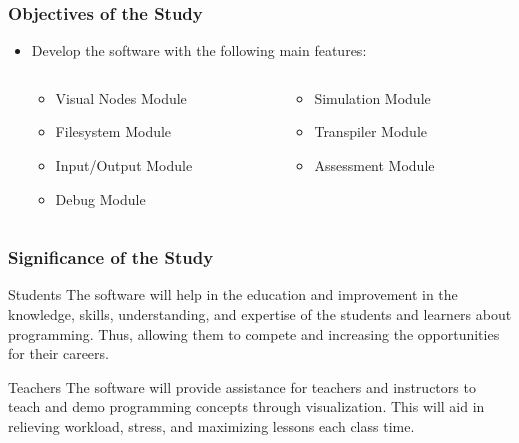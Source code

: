 \documentclass[handout]{beamer}
\newcommand{\parx}{
	\setlength{\parindent}{4em}
	\par}
\begin{document}
\begin{frame}
	\frametitle{Objectives of the Study}
	\justifying
	\parx
	\begin{itemize}
		\item<1-> Develop the software with the following main features:
		\begin{columns}
			\begin{column}{.5\linewidth}
				\begin{itemize}
						\item<2-> Visual Nodes Module
						\item<3-> Filesystem Module
						\item<4-> Input/Output Module
						\item<5-> Debug Module
				\end{itemize}
			\end{column}
			\begin{column}{.5\linewidth}
				\begin{itemize}
						\item<9-> Simulation Module
						\item<7-> Transpiler Module
						\item<8-> Assessment Module
				\end{itemize}
			\end{column}
		\end{columns}
	\end{itemize}
\end{frame}

\begin{frame}
	\frametitle{Significance of the Study}
	\begin{block}{Students}
		The software will help in the education and improvement in the knowledge,
		skills, understanding, and expertise of the students and learners about
		programming. Thus, allowing them to compete and increasing the
		opportunities for their careers.
	\end{block}

	\begin{block}{Teachers}
		The software will provide assistance for teachers and instructors to teach and
		demo programming concepts through visualization. This will aid in relieving workload,
		stress, and maximizing lessons each class time.
	\end{block}
\end{frame}
\end{document}
